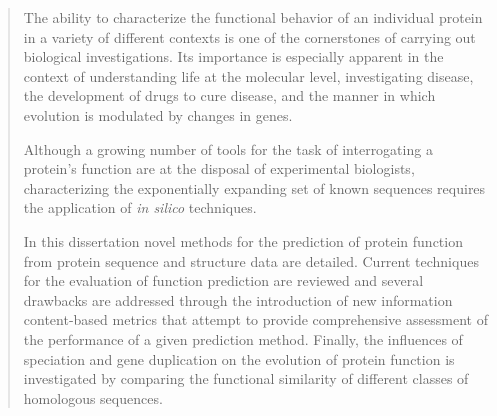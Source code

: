 
\begin{abstract} 
	
	The ability to characterize the functional behavior of an individual protein in a variety of different contexts is one of the cornerstones of carrying out biological investigations. Its importance is especially apparent in the context of understanding life at the molecular level, investigating disease, the development of drugs to cure disease, and the manner in which evolution is modulated by changes in genes. 
	
Although a growing number of tools for the task of interrogating a protein's function are at the disposal of experimental biologists, characterizing the exponentially expanding set of known sequences requires the application of \textit{in silico} techniques.
 
In this dissertation novel methods for the prediction of protein function from protein sequence and structure data are detailed. Current techniques for the evaluation of function prediction are reviewed and several drawbacks are addressed through the introduction of new information content-based metrics that attempt to provide comprehensive assessment of the performance of a given prediction method. Finally, the influences of speciation and gene duplication on the evolution of protein function is investigated by comparing the functional similarity of different classes of homologous sequences.
\end{abstract}
